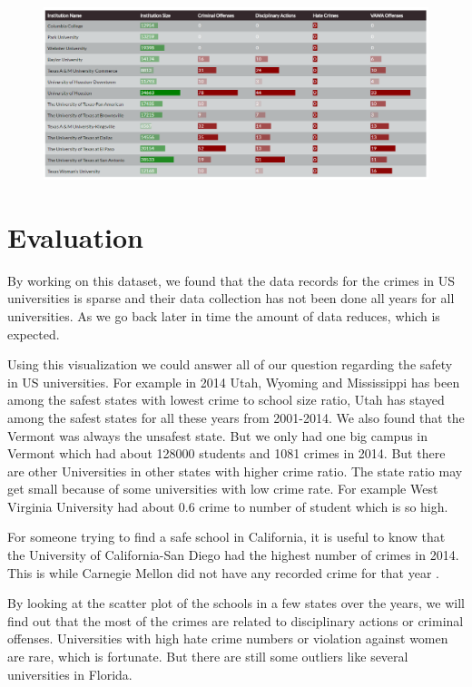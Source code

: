 \documentclass[12pt]{article}
\begin{document}
\begin{figure}[H]
   \centering{}
	       \includegraphics[width=6in]{table.PNG}        
\caption{}
\label{fig:donut}
\end{figure}

\section{Evaluation}

By working on this dataset, we found that the data records for the crimes in US universities is sparse and their data collection has not been done all years for all universities. As we go back later in time the amount of data reduces, which is expected. 

Using this visualization we could answer all of our question regarding the safety in US universities. For example in 2014 Utah, Wyoming and Mississippi has been among the safest states with lowest crime to school size ratio, Utah has stayed among the safest states for all these years from 2001-2014. We also found that the Vermont was always the unsafest state. But we only had one big campus in Vermont which had about 128000 students and 1081 crimes in 2014. But there are other Universities in other states with higher crime ratio. The state ratio may get small because of some universities with low crime rate. For example West Virginia University had about 0.6 crime to number of student which is so high. 

For someone trying to find a safe school in California, it is useful to know that the University of California-San Diego had the highest number of crimes in 2014. This is while Carnegie Mellon did not have any recorded crime for that year .

By looking at the scatter plot of the schools in a few states over the years, we will find out that the most of the crimes are related to disciplinary actions or criminal offenses. Universities with high hate crime numbers or violation against women are rare, which is fortunate. But there are still some outliers like several universities in Florida.
\end{document}
